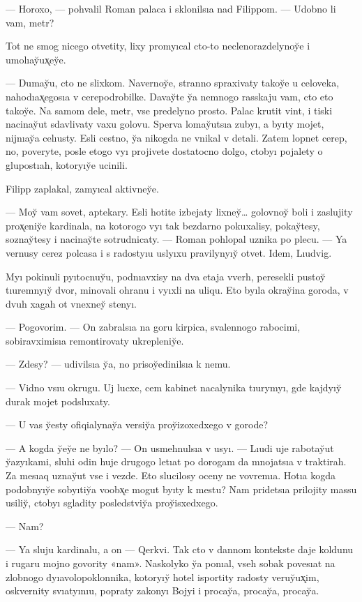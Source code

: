 \documentclass[10pt]{book}
\begin{document}
— Horoxo, — pohvalil Roman palaca i sklonilsıa nad Filippom. — Udobno li vam, metr?

Tot ne smog nicego otvetity, lixy promyıcal cto-to neclenorazdelynoy̆e i umolıay̆ux̨ey̆e.

— Dumay̆u, cto ne slixkom. Navernoy̆e, stranno spraxivaty takoy̆e u celoveka, nahodıax̨egosıa v cerepodrobilke. Davay̆te y̆a nemnogo rasskaju vam, cto eto takoy̆e. Na samom dele, metr, vse predelyno prosto. Palac krutit vint, i tiski nacinay̆ut sdavlivaty vaxu golovu. Sperva lomay̆utsıa zubyı, a byıty mojet, nijnıay̆a celıusty. Esli cestno, y̆a nikogda ne vnikal v detali. Zatem lopnet cerep, no, poveryte, posle etogo vyı projivete dostatocno dolgo, ctobyı pojalety o glupostıah, kotoryıy̆e ucinili.

Filipp zaplakal, zamyıcal aktivney̆e.

— Moy̆ vam sovet, aptekary. Esli hotite izbejaty lixney̆… golovnoy̆ boli i zaslujity prox̨eniy̆e kardinala, na kotorogo vyı tak bezdarno pokuxalisy, pokay̆tesy, soznay̆tesy i nacinay̆te sotrudnicaty. — Roman pohlopal uznika po plecu. — Ya vernusy cerez polcasa i s radostyıu uslyıxu pravilynyıy̆ otvet. Idem, Lıudvig.

Myı pokinuli pyıtocnuy̆u, podnıavxisy na dva etaja vverh, peresekli pustoy̆ tıuremnyıy̆ dvor, minovali ohranu i vyıxli na uliqu. Eto byıla okray̆ina goroda, v dvuh xagah ot vnexney̆ stenyı.

— Pogovorim. — On zabralsıa na goru kirpica, svalennogo rabocimi, sobiravximisıa remontirovaty ukrepleniy̆e.

— Zdesy? — udivilsıa y̆a, no prisoy̆edinilsıa k nemu.

— Vidno vsıu okrugu. Uj lucxe, cem kabinet nacalynika tıurymyı, gde kajdyıy̆ durak mojet podsluxaty.

— U vas y̆esty ofiqialynay̆a versiy̆a proy̆izoxedxego v gorode?

— A kogda y̆ey̆e ne byılo? — On usmehnulsıa v usyı. — Lıudi uje rabotay̆ut y̆azyıkami, sluhi odin huje drugogo letıat po dorogam da mnojatsıa v traktirah. Za mesıaq uznay̆ut vse i vezde. Eto slucilosy oceny ne vovremıa. Hotıa kogda podobnyıy̆e sobyıtiy̆a voobx̨e mogut byıty k mestu? Nam pridetsıa prilojity massu usiliy̆, ctobyı sgladity posledstviy̆a proy̆isxedxego.

— Nam?

— Ya sluju kardinalu, a on — Qerkvi. Tak cto v dannom kontekste daje koldunu i rugaru mojno govority «nam». Naskolyko y̆a ponıal, vseh sobak povesıat na zlobnogo dyıavolopoklonnika, kotoryıy̆ hotel isportity radosty veruy̆ux̨im, oskvernity svıatyınıu, popraty zakonyı Bojyi i procay̆a, procay̆a, procay̆a.
\end{document}
